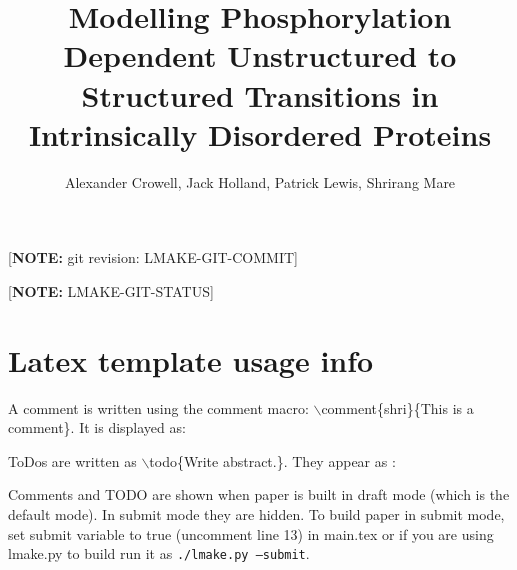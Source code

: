 \documentclass[twocolumn]{article}     %
\newcommand{\comment}[2]{\relax}
\newcommand{\todo}[1]{\relax}
\newcommand{\comment}[2]{\textcolor{commentcolor}{(#2 \emph{--#1})}}
\newcommand{\todo}[1]{\textcolor{commentcolor}{(TODO: #1)}}
\begin{document}
\title{Modelling Phosphorylation Dependent Unstructured to Structured Transitions in Intrinsically Disordered Proteins}

\author{Alexander Crowell, Jack Holland, Patrick Lewis, Shrirang Mare}

\date{}

\maketitle

\ifsubmit
{}

[\textbf{NOTE:} git revision: LMAKE-GIT-COMMIT]

[\textbf{NOTE:} LMAKE-GIT-STATUS]

\fi



\ifsubmit
\else

\section*{Latex template usage info}

A comment is written using the comment macro: $\backslash$comment\{shri\}\{This is a comment\}. It is displayed as:

\comment{shri}{This is a comment}


ToDos are written as $\backslash$todo\{Write abstract.\}. They appear as :

\todo{Write abstract.}

Comments and TODO are shown when paper is built in draft mode (which is the default mode). In submit mode they are hidden. To build paper in submit mode, set submit variable to true (uncomment line 13) in main.tex or if you are using lmake.py to build run it as \texttt{./lmake.py --submit}.
\fi








\end{document}
